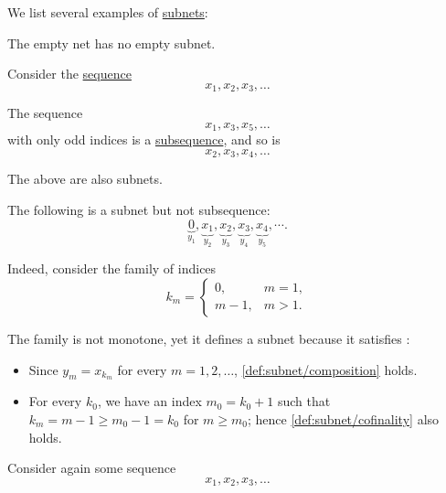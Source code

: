 \begin{example}\label{ex:def:subnet}
  We list several examples of \hyperref[def:subnet]{subnets}:
  \begin{thmenum}
     The empty net has no empty subnet.

     Consider the \hyperref[def:sequence]{sequence}
    \begin{equation*}
      x_1, x_2, x_3, \ldots
    \end{equation*}

    The sequence
    \begin{equation*}
      x_1, x_3, x_5, \ldots
    \end{equation*}
    with only odd indices is a \hyperref[def:subsequence]{subsequence}, and so is
    \begin{equation*}
      x_2, x_3, x_4, \ldots
    \end{equation*}

    The above are also subnets.

     The following is a subnet but not subsequence:
    \begin{equation*}
      \underbrace{0}_{y_1}, \underbrace{x_1}_{y_2}, \underbrace{x_2}_{y_3}, \underbrace{x_3}_{y_4}, \underbrace{x_4}_{y_5}, \cdots.
    \end{equation*}

    Indeed, consider the family of indices
    \begin{equation*}
      k_m = \begin{cases}
        0,     &m = 1, \\
        m - 1, &m > 1.
      \end{cases}
    \end{equation*}

    The family is not monotone, yet it defines a subnet because it satisfies :
    \begin{itemize}
      \item Since \( y_m = x_{k_m} \) for every \( m = 1, 2, \ldots \), \ref{def:subnet/composition} holds.
      \item For every \( k_0 \), we have an index \( m_0 = k_0 + 1 \) such that \( k_m = m - 1 \geq m_0 - 1 = k_0 \) for \( m \geq m_0 \); hence \ref{def:subnet/cofinality} also holds.
    \end{itemize}

     Consider again some sequence
    \begin{equation*}
      x_1, x_2, x_3, \ldots
    \end{equation*}


\end{thmenum}
\end{example}
